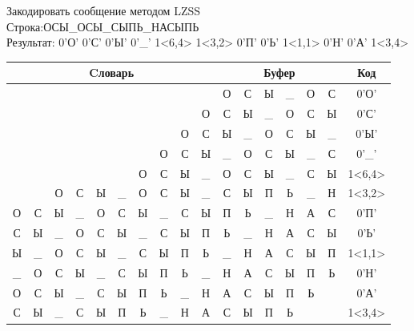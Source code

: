 \documentclass[a4paper, 12pt]{article}
\begin{document}
Закодировать сообщение методом LZSS\\
Строка:ОСЫ\_ОСЫ\_СЫПЬ\_НАСЫПЬ\\
Результат: 0'О' 0'С' 0'Ы' 0'\_' 1<6,4> 1<3,2> 0'П' 0'Ь' 1<1,1> 0'Н' 0'А' 1<3,4>\\
\begin{table}[h!]
\centering
\begin{tabular}{|c|c|c|c|c|c|c|c|c|c|c|c|c|c|c|c|c|}
\hline
\multicolumn{10}{|c|}{Cловарь} & \multicolumn{6}{c|}{Буфер} & Код  \\ \hline
  &   &   &   &   &   &   &   &   &   & О & С & Ы & \_ & О & С & 0'О'\\ \hline
  &   &   &   &   &   &   &   &   & О & С & Ы & \_ & О & С & Ы & 0'С'\\ \hline
  &   &   &   &   &   &   &   & О & С & Ы & \_ & О & С & Ы & \_ & 0'Ы'\\ \hline
  &   &   &   &   &   &   & О & С & Ы & \_ & О & С & Ы & \_ & С & 0'\_'\\ \hline
  &   &   &   &   &   & \cellcolor[HTML]{FFFF00} О & \cellcolor[HTML]{FFFF00} С & \cellcolor[HTML]{FFFF00} Ы & \cellcolor[HTML]{FFFF00} \_ & \cellcolor[HTML]{FFFF00} О & \cellcolor[HTML]{FFFF00} С & \cellcolor[HTML]{FFFF00} Ы & \cellcolor[HTML]{FFFF00} \_ & С & Ы & 1<6,4>\\ \hline
  &   & О & \cellcolor[HTML]{FFFF00} С & \cellcolor[HTML]{FFFF00} Ы & \_ & О & С & Ы & \_ & \cellcolor[HTML]{FFFF00} С & \cellcolor[HTML]{FFFF00} Ы & П & Ь & \_ & Н & 1<3,2>\\ \hline
О & С & Ы & \_ & О & С & Ы & \_ & С & Ы & П & Ь & \_ & Н & А & С & 0'П'\\ \hline
С & Ы & \_ & О & С & Ы & \_ & С & Ы & П & Ь & \_ & Н & А & С & Ы & 0'Ь'\\ \hline
Ы & \cellcolor[HTML]{FFFF00} \_ & О & С & Ы & \_ & С & Ы & П & Ь & \cellcolor[HTML]{FFFF00} \_ & Н & А & С & Ы & П & 1<1,1>\\ \hline
\_ & О & С & Ы & \_ & С & Ы & П & Ь & \_ & Н & А & С & Ы & П & Ь & 0'Н'\\ \hline
О & С & Ы & \_ & С & Ы & П & Ь & \_ & Н & А & С & Ы & П & Ь &   & 0'А'\\ \hline
С & Ы & \_ & \cellcolor[HTML]{FFFF00} С & \cellcolor[HTML]{FFFF00} Ы & \cellcolor[HTML]{FFFF00} П & \cellcolor[HTML]{FFFF00} Ь & \_ & Н & А & \cellcolor[HTML]{FFFF00} С & \cellcolor[HTML]{FFFF00} Ы & \cellcolor[HTML]{FFFF00} П & \cellcolor[HTML]{FFFF00} Ь &   &   & 1<3,4>\\ \hline
\end{tabular}
\end{table}
\end{document}
